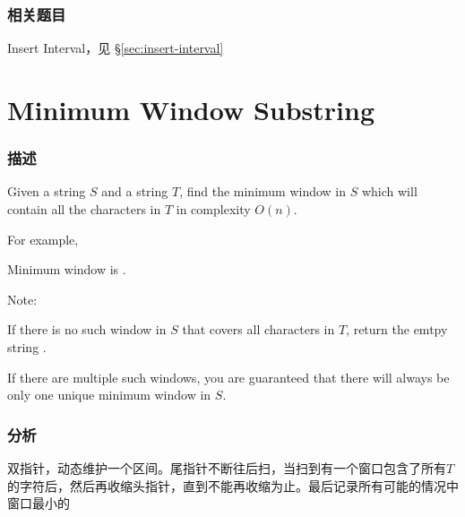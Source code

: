 \subsubsection{相关题目}

\begindot
\item Insert Interval，见 \S \ref{sec:insert-interval}
\myenddot


\section{Minimum Window Substring} %
\label{sec:minimum-window-substring}


\subsubsection{描述}
Given a string $S$ and a string $T$, find the minimum window in $S$ which will contain all the characters in $T$ in complexity $O(n)$.

For example, 

Minimum window is .

Note:
\begindot
\item If there is no such window in $S$ that covers all characters in $T$, return the emtpy string .
\item If there are multiple such windows, you are guaranteed that there will always be only one unique minimum window in $S$.
\myenddot


\subsubsection{分析}
双指针，动态维护一个区间。尾指针不断往后扫，当扫到有一个窗口包含了所有$T$的字符后，然后再收缩头指针，直到不能再收缩为止。最后记录所有可能的情况中窗口最小的



